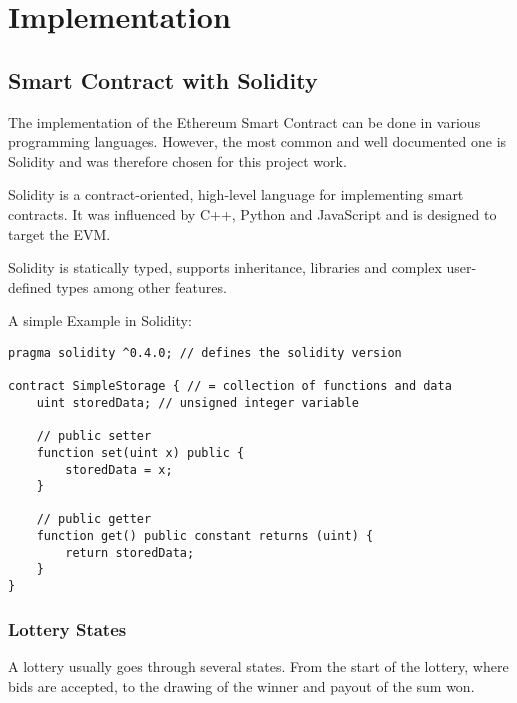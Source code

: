 \chapter{Implementation}\label{chap:impl}
\chapterstart


\section{ Smart Contract with Solidity}\label{sec:solidity}

The implementation of the Ethereum Smart Contract can be done in various programming languages. However, the most common and well documented one is Solidity and was therefore chosen for this project work.

Solidity is a contract-oriented, high-level language for implementing smart contracts. It was influenced by C++, Python and JavaScript and is designed to target the \ac{EVM}.

Solidity is statically typed, supports inheritance, libraries and complex user-defined types among other features.


A simple Example in Solidity:
\begin{lstlisting}[language=Solidity]
pragma solidity ^0.4.0; // defines the solidity version

contract SimpleStorage { // = collection of functions and data
    uint storedData; // unsigned integer variable

    // public setter
    function set(uint x) public {
        storedData = x;
    }

    // public getter
    function get() public constant returns (uint) {
        return storedData;
    }
}
\end{lstlisting}


\subsection{Lottery States}\label{sec:states}

A lottery usually goes through several states. From the start of the lottery, where bids are accepted, to the drawing of the winner and payout of the sum won.

